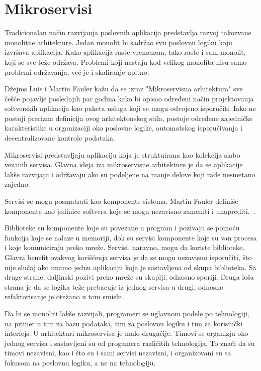 \section{Mikroservisi}\label{sec:arhitektura-mikroservisi}

Tradicionalan način razvijanja poslovnih aplikacija predstavlja razvoj takozvane monolitne arhitekture. 
Jedan monolit bi sadržao svu poslovnu logiku koju izvršava aplikacija. Kako aplikacija raste vremenom, 
tako raste i sam monolit, koji se sve teže održava. Problemi koji nastaju kod velikog monolita nisu 
samo problemi održavanja, već je i skaliranje upitno. 

Džejms Luis i Martin Fauler kažu da se izraz "Mikroservisna arhitektura" sve češće pojavlje poslednjih 
par godina kako bi opisao određeni način projektovanja softverskih aplikacija kao paketa usluga koji se 
mogu odvojeno isporučiti. Iako ne postoji precizna definicija ovog arhitektonskog stila, postoje određene 
zajedničke karakteristike u organizaciji oko poslovne logike, automatskog isporučivanja i decentralizovane 
kontrole podataka.~\cite{martinfowler_microservices} 

Mikroservisi predstavljaju aplikaciju koja je struktuirana kao kolekcija slabo vezanih servisa. Glavna 
ideja iza mikroservisne arhitekture je da se aplikacije lakše razvijaju i održavaju ako su podeljene 
na manje delove koji rade nesmetano zajedno.

Servisi se mogu posmatrati kao komponente sistema. Martin Fauler definiše komponente kao jedinice 
softvera koje se mogu nezavisno zameniti i unaprediti.~\cite{martinfowler_software_component}.

Biblioteke su komponente koje su povezane u program i pozivaju se pomoću funkcija koje se nalaze u 
memoriji, dok su servisi komponente koje su van procesa i koje komuniciraju preko mreže.
Servisi, naravno, mogu da koriste biblioteke. Glavni benefit ovakvog korišćenja servisa je da se mogu 
nezavisno isporučiti, što nije slučaj ako imamo jednu aplikaciju koja je sastavljena od skupa biblioteka.
Sa druge strane, daljinski pozivi preko mreže su skuplji, odnosno sporiji. 
Druga loša strana je da se logika teže prebacuje iz jednog servisa u drugi, odnosno refaktorisanje je 
otežano u tom smislu.

Da bi se monoliti lakše razvijali, programeri se uglavnom podele po tehnologiji, na primer u tim za 
bazu podataka, tim za poslovnu logiku i tim za korisnički interfejs. U arhitekturi mikroservisa je malo 
drugačije. Timovi se organizju oko jednog servisa i sastavljeni su od progamera različitih tehnologija.
To znači da su timovi nezavisni, kao i što su i sami servisi nezavisni, i organizovani su sa fokusom na 
poslovnu logiku, a ne na tehnologiju.

